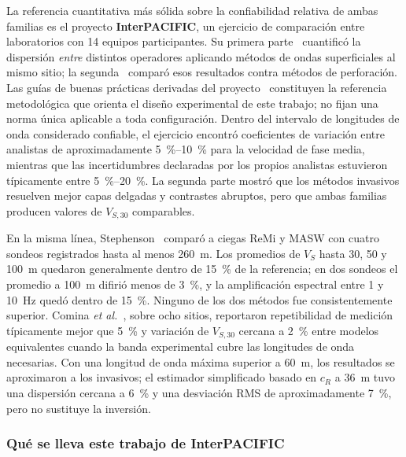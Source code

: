 La referencia cuantitativa m\'as s\'olida sobre la confiabilidad relativa de ambas familias
es el proyecto \textbf{InterPACIFIC}, un ejercicio de comparaci\'on entre laboratorios con
14 equipos participantes. Su primera parte~\cite{Garofalo2016a} cuantific\'o la dispersi\'on
\emph{entre} distintos operadores aplicando m\'etodos de ondas superficiales al mismo
sitio; la segunda~\cite{Garofalo2016b} compar\'o esos resultados contra m\'etodos de
perforaci\'on. Las gu\'ias de buenas pr\'acticas derivadas del proyecto~\cite{Foti2018}
constituyen la referencia metodol\'ogica que orienta el dise\~no experimental de este
trabajo; no fijan una norma \'unica aplicable a toda configuraci\'on.
Dentro del intervalo de longitudes de onda considerado confiable, el ejercicio encontr\'o
coeficientes de variaci\'on entre analistas de aproximadamente \SIrange{5}{10}{\percent}
para la velocidad de fase media, mientras que las incertidumbres declaradas por los
propios analistas estuvieron t\'ipicamente entre \SIrange{5}{20}{\percent}. La segunda
parte mostr\'o que los m\'etodos invasivos resuelven mejor capas delgadas y contrastes
abruptos, pero que ambas familias producen valores de $V_{S,30}$ comparables.

En la misma l\'inea, Stephenson~\cite{Stephenson2005} compar\'o a ciegas ReMi y MASW con
cuatro sondeos registrados hasta al menos \SI{260}{\meter}. Los promedios de $V_S$ hasta
30, 50 y \SI{100}{\meter} quedaron generalmente dentro de \SI{15}{\percent} de la
referencia; en dos sondeos el promedio a \SI{100}{\meter} difiri\'o menos de
\SI{3}{\percent}, y la amplificaci\'on espectral entre 1 y \SI{10}{\hertz} qued\'o dentro
de \SI{15}{\percent}. Ninguno de los dos m\'etodos fue consistentemente superior.
Comina \emph{et al.}~\cite{Comina2011}, sobre ocho sitios, reportaron repetibilidad de
medici\'on t\'ipicamente mejor que \SI{5}{\percent} y variaci\'on de $V_{S,30}$ cercana a
\SI{2}{\percent} entre modelos equivalentes cuando la banda experimental cubre las
longitudes de onda necesarias. Con una longitud de onda m\'axima superior a
\SI{60}{\meter}, los resultados se aproximaron a los invasivos; el estimador simplificado
basado en $c_R$ a \SI{36}{\meter} tuvo una dispersi\'on cercana a \SI{6}{\percent} y una
desviaci\'on RMS de aproximadamente \SI{7}{\percent}, pero no sustituye la inversi\'on.

\subsubsection{Qu\'e se lleva este trabajo de InterPACIFIC}
\label{sec:buenas-practicas}

